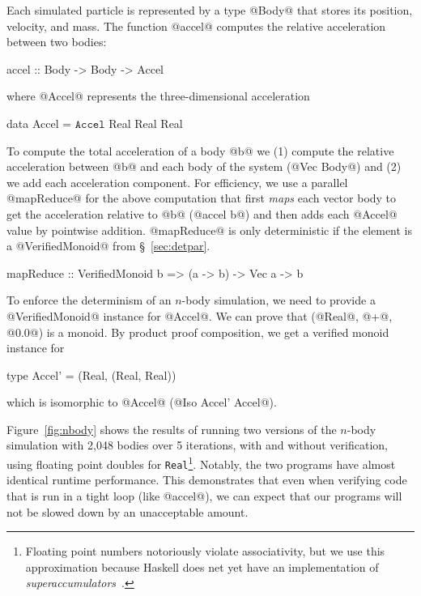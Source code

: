 Each simulated particle is represented by a
type @Body@ that stores its position, velocity, and mass.
%
The function @accel@ computes the relative acceleration
between two bodies:
\begin{mcode}
  accel :: Body -> Body -> Accel
\end{mcode}
where @Accel@ represents the three-dimensional acceleration
\begin{mcode}
  data Accel = $\texttt{Accel}$ Real Real Real
\end{mcode}
%
To compute the total acceleration
of a body @b@ we
(1) compute the relative acceleration between @b@
and each body of the system (@Vec Body@) and
(2) we add each acceleration component.
%
For efficiency, we use a parallel @mapReduce@ for the above
computation that
first \textit{maps} each vector body to get the acceleration relative to @b@
(@accel b@) and then adds each @Accel@ value by pointwise addition.
%
@mapReduce@ is only deterministic if the element is a @VerifiedMonoid@
from \S~\ref{sec:detpar}.
\begin{mcode}
  mapReduce :: VerifiedMonoid b => (a -> b) -> Vec a -> b
\end{mcode}
%
To enforce the determinism of an $n$-body simulation, we need to provide a
@VerifiedMonoid@ instance for @Accel@.
%
We can prove that (@Real@, @+@, @0.0@)
is a monoid.
%
By product proof composition, we get a verified monoid instance for
\begin{mcode}
  type Accel' = (Real, (Real, Real))
\end{mcode}
which is isomorphic to @Accel@ (\ie @Iso Accel' Accel@).

Figure~\ref{fig:nbody} shows the results of running two versions of the $n$-body
simulation with 2,048 bodies over 5 iterations, with and without verification,
using floating point doubles for \texttt{Real}\footnote{Floating point numbers
  notoriously violate associativity, but we use this approximation because
  Haskell does net yet have an implementation of {\em
    superaccumulators}~\cite{superaccumulation}.}. Notably, the two programs have almost
identical runtime performance.  This demonstrates that even when verifying code
that is run in a tight loop (like @accel@), we can expect that our programs
will not be slowed down by an unacceptable amount.

